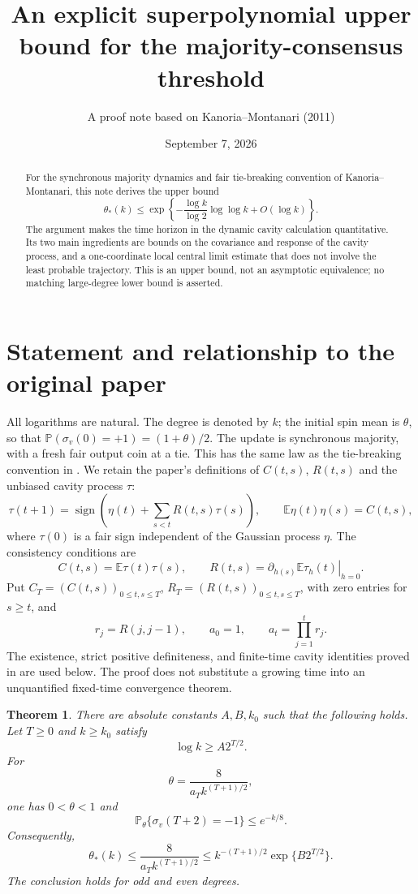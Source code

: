 \documentclass[11pt]{article}
\title{An explicit superpolynomial upper bound for the majority-consensus threshold}
\author{A proof note based on Kanoria--Montanari (2011)}
\date{September 7, 2026}
\newtheorem{theorem}{Theorem}[section]
\theoremstyle{remark}\newtheorem{remark}[theorem]{Remark}
\newcommand{\E}{\mathbb E}
\newcommand{\Pp}{\mathbb P}
\newcommand{\sign}{\operatorname{sign}}
\begin{document}
\maketitle
\begin{abstract}
For the synchronous majority dynamics and fair tie-breaking convention of
Kanoria--Montanari, this note derives the upper bound
\[
 \theta_*(k)\le
 \exp\!\left\{-\frac{\log k}{\log 2}
  \log\log k+O(\log k)\right\}.
\]
The argument makes the time horizon in the dynamic cavity calculation
quantitative. Its two main ingredients are bounds on the covariance and
response of the cavity process, and a one-coordinate local central limit
estimate that does not involve the least probable trajectory.
This is an upper bound, not an asymptotic equivalence; no matching
large-degree lower bound is asserted.
\end{abstract}

\section{Statement and relationship to the original paper}
All logarithms are natural. The degree is denoted by $k$; the initial spin
mean is $\theta$, so that $\Pp(\sigma_v(0)=+1)=(1+\theta)/2$.
The update is synchronous majority, with a fresh fair output coin at a tie.
This has the same law as the tie-breaking convention in \cite{KM}.
We retain the paper's definitions of $C(t,s)$, $R(t,s)$ and the unbiased
cavity process $\tau$:
\[
 \tau(t+1)=\sign\!\left(\eta(t)+\sum_{s<t}R(t,s)\tau(s)\right),
 \qquad \E\eta(t)\eta(s)=C(t,s),
\]
where $\tau(0)$ is a fair sign independent of the Gaussian process $\eta$.
The consistency conditions are
\[
 C(t,s)=\E\tau(t)\tau(s),\qquad
 R(t,s)=\left.\partial_{h(s)}\E\tau_h(t)\right|_{h=0}.
\]
Put $C_T=(C(t,s))_{0\le t,s\le T}$,
$R_T=(R(t,s))_{0\le t,s\le T}$, with zero entries for $s\ge t$, and
\[
 r_j=R(j,j-1),\qquad a_0=1,\qquad a_t=\prod_{j=1}^t r_j.
\]
The existence, strict positive definiteness, and finite-time cavity
identities proved in \cite{KM} are used below. The proof does not substitute
a growing time into an unquantified fixed-time convergence theorem.

\begin{theorem}\label{thm:finite}
There are absolute constants $A,B,k_0$ such that the following holds.
Let $T\ge0$ and $k\ge k_0$ satisfy
\begin{equation}\label{eq:degree-condition}
 \log k\ge A2^{T/2}.
\end{equation}
For
\begin{equation}\label{eq:initial-bias}
 \theta=\frac{8}{a_T k^{(T+1)/2}},
\end{equation}
one has $0<\theta<1$ and
\[
 \Pp_\theta\{\sigma_v(T+2)=-1\}\le e^{-k/8}.
\]
Consequently,
\begin{equation}\label{eq:finite-bound}
 \theta_*(k)\le\frac{8}{a_T k^{(T+1)/2}}
 \le k^{-(T+1)/2}\exp\{B2^{T/2}\}.
\end{equation}
The conclusion holds for odd and even degrees.
\end{theorem}
\end{document}
